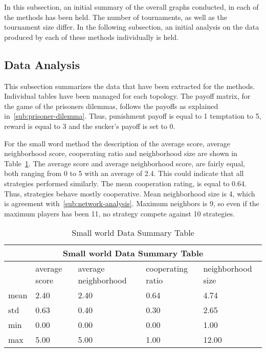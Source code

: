 In this subsection, an initial summary of the overall graphs conducted, in
each of the methods has been held. The number of tournaments, as well as the
tournament size differ. In the following subsection, an initial analysis on the
data produced by each of these methods individually is held.

\subsection{Data Analysis}
This subsection summarizes the data that have been extracted for the methods.
Individual tables have been managed for each topology. The payoff matrix, for
the game of the prisoners dilemmas, follows the payoffs as explained in~\autoref{sub:prisoner-dilemma}.
Thus, punishment payoff is equal to 1 temptation to 5, reward is equal to 3 and
the sucker's payoff is set to 0.

For the small word method the description of the average score, average
neighborhood score, cooperating ratio and neighborhood size are shown in
Table~\ref{table:summary-small-data}. The average score and average
neighborhood score, are fairly equal, both ranging from 0 to 5 with an average of
2.4. This could indicate that all strategies performed similarly. The mean
cooperation rating, is equal to 0.64. Thus, strategies behave mostly cooperative.
Mean neighborhood size is 4, which is agreement with~\autoref{sub:network-analysis}.
Maximum neighbors is 9, so even if the maximum players has been 11, no strategy
compete against 10 strategies.

\begin{table}[!hbtp]
	\centering
	\begin{adjustbox}{width=0.8\textwidth}
		\small
		\begin{tabular}{|l|l|l|l|l|}
			\hline
			\multicolumn{5}{|c|}{Small world Data Summary Table}                                \\ \hline
			     & average score & average neighborhood & cooperating ratio & neighborhood size \\ \hline
			mean & 2.40          & 2.40                 & 0.64              & 4.74              \\ \hline
			std  & 0.63          & 0.40                 & 0.30              & 2.65              \\ \hline
			min  & 0.00          & 0.00                 & 0.00              & 1.00              \\ \hline
			max  & 5.00          & 5.00                 & 1.00              & 12.00             \\ \hline
		\end{tabular}
	\end{adjustbox}
	\caption{Small world Data Summary Table}
	\label{table:summary-small-data}
\end{table}

